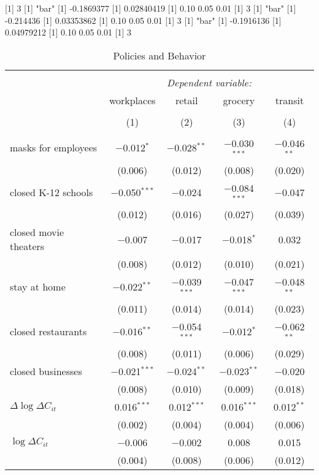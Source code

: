 [1] 3
[1] "bar"
[1] -0.1869377
[1] 0.02840419
[1] 0.10 0.05 0.01
[1] 3
[1] "bar"
[1] -0.214436
[1] 0.03353862
[1] 0.10 0.05 0.01
[1] 3
[1] "bar"
[1] -0.1916136
[1] 0.04979212
[1] 0.10 0.05 0.01
[1] 3

\begin{table}[!htbp] \centering 
  \caption{Policies and Behavior} 
  \label{} 
\begin{tabular}{@{\extracolsep{1pt}}lcccc} 
\\[-1.8ex]\hline 
\hline \\[-1.8ex] 
 & \multicolumn{4}{c}{\textit{Dependent variable:}} \\ 
\cline{2-5} 
 & workplaces & retail & grocery & transit \\ 
\\[-1.8ex] & (1) & (2) & (3) & (4)\\ 
\hline \\[-1.8ex] 
 masks for employees & $-$0.012$^{*}$ & $-$0.028$^{**}$ & $-$0.030$^{***}$ & $-$0.046$^{**}$ \\ 
  & (0.006) & (0.012) & (0.008) & (0.020) \\ 
  closed K-12 schools & $-$0.050$^{***}$ & $-$0.024 & $-$0.084$^{***}$ & $-$0.047 \\ 
  & (0.012) & (0.016) & (0.027) & (0.039) \\ 
  closed movie theaters & $-$0.007 & $-$0.017 & $-$0.018$^{*}$ & 0.032 \\ 
  & (0.008) & (0.012) & (0.010) & (0.021) \\ 
  stay at home & $-$0.022$^{**}$ & $-$0.039$^{***}$ & $-$0.047$^{***}$ & $-$0.048$^{**}$ \\ 
  & (0.011) & (0.014) & (0.014) & (0.023) \\ 
  closed restaurants & $-$0.016$^{**}$ & $-$0.054$^{***}$ & $-$0.012$^{*}$ & $-$0.062$^{**}$ \\ 
  & (0.008) & (0.011) & (0.006) & (0.029) \\ 
  closed businesses & $-$0.021$^{***}$ & $-$0.024$^{**}$ & $-$0.023$^{**}$ & $-$0.020 \\ 
  & (0.008) & (0.010) & (0.009) & (0.018) \\ 
  $\Delta \log \Delta C_{it}$ & 0.016$^{***}$ & 0.012$^{***}$ & 0.016$^{***}$ & 0.012$^{**}$ \\ 
  & (0.002) & (0.004) & (0.004) & (0.006) \\ 
  $\log \Delta C_{it}$ & $-$0.006 & $-$0.002 & 0.008 & 0.015 \\ 
  & (0.004) & (0.008) & (0.006) & (0.012) \\ 

\end{tabular}
\end{table}
